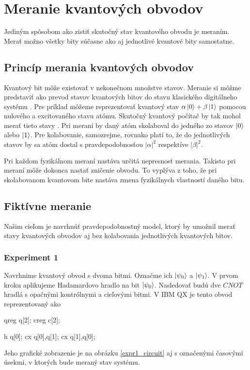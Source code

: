 
\chapter{Meranie kvantových obvodov}

Jediným spôsobom ako zistiť skutočný stav kvantového obvodu je meraním.
Merať možno všetky bity súčasne ako aj jednotlivé kvantové bity samostatne.

\section{Princíp merania kvantových obvodov}

Kvantový bit môže existovať v nekonečnom množstve stavov. Meranie si môžme 
predstaviť ako prevod stavov kvantových bitov do stavu klasického digitálneho
systému \cite{Nie10}. Pre príklad môžeme reprezentovať kvantový stav 
\(\alpha\ket{0} + \beta\ket{1}\) pomocou nulového a excitovaného stavu atómu.
Skutočný kvantový počítač by tak mohol merať tieto stavy \cite{Sim97}
. Pri meraní by 
daný atóm skolaboval do jedného zo stavov \(\ket{0}\) alebo \(\ket{1}\).
Pre kolabovanie, samozrejme, rovnako platí to, že do jednotlivých stavov by
sa atóm dostal s pravdepodobnosťou \(|\alpha|^2\) respektíve \(|\beta|^2\).


Pri každom fyzikálnom meraní nastáva určitá nepresnosť merania. Takisto 
pri meraní môže dokonca nastať zničenie obvodu. To vyplýva z toho, že pri
skolabovanom kvantovom bite nastáva zmena fyzikálnych vlastností daného bitu. 

\section{Fiktívne meranie}

Našim cieľom je navrhnúť pravdepodobnostný model, ktorý by umožnil merať
stavy kvantových obvodov aj bez kolabovania jednotlivých kvantových bitov.

\subsection{Experiment 1}
Navrhnime kvantový obvod s dvoma bitmi. Označme ich \(\ket{\psi_0}\) a 
\(\ket{\psi_1}\). V prvom kroku aplikujeme Hadamardovo hradlo na bit 
\(\ket{\psi_0}\). Nasledovať budú dve \(CNOT\) hradlá s opačnými kontrólnymi 
a cieľovými bitmi. V IBM QX je tento obvod reprezentovaný ako 
\begin{code}
qreg q[2];
creg c[2];

h q[0];
cx q[0],q[1];
cx q[1],q[0];
\end{code}
Jeho grafické zobrazenie je na obrázku \ref{expr1_circuit} aj s označenými
časovými úsekmi, v ktorých bude meraný stav systému. 

